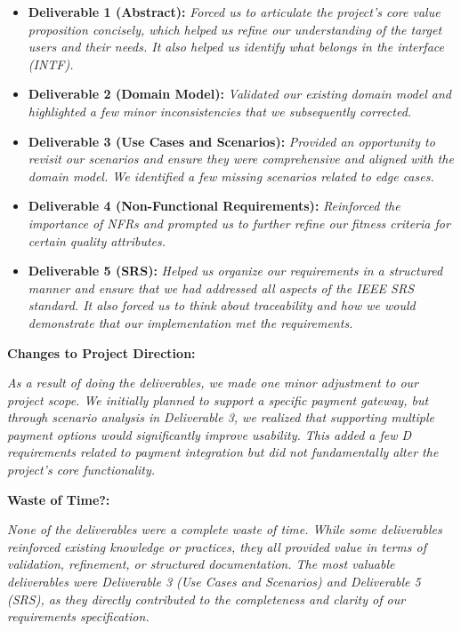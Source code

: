 \documentclass{article}
\begin{document}
\begin{itemize}
    \item \textbf{Deliverable 1 (Abstract):} \textit{Forced us to articulate the project's core value proposition concisely, which helped us refine our understanding of the target users and their needs. It also helped us identify what belongs in the interface (INTF).}
    \item \textbf{Deliverable 2 (Domain Model):} \textit{Validated our existing domain model and highlighted a few minor inconsistencies that we subsequently corrected.}
    \item \textbf{Deliverable 3 (Use Cases and Scenarios):} \textit{Provided an opportunity to revisit our scenarios and ensure they were comprehensive and aligned with the domain model. We identified a few missing scenarios related to edge cases.}
    \item \textbf{Deliverable 4 (Non-Functional Requirements):} \textit{Reinforced the importance of NFRs and prompted us to further refine our fitness criteria for certain quality attributes.}
    \item \textbf{Deliverable 5 (SRS):} \textit{Helped us organize our requirements in a structured manner and ensure that we had addressed all aspects of the IEEE SRS standard. It also forced us to think about traceability and how we would demonstrate that our implementation met the requirements.}
\end{itemize}

\textbf{Changes to Project Direction:}

\textit{As a result of doing the deliverables, we made one minor adjustment to our project scope. We initially planned to support a specific payment gateway, but through scenario analysis in Deliverable 3, we realized that supporting multiple payment options would significantly improve usability. This added a few D requirements related to payment integration but did not fundamentally alter the project's core functionality.}

\textbf{Waste of Time?:}

\textit{None of the deliverables were a complete waste of time. While some deliverables reinforced existing knowledge or practices, they all provided value in terms of validation, refinement, or structured documentation. The most valuable deliverables were Deliverable 3 (Use Cases and Scenarios) and Deliverable 5 (SRS), as they directly contributed to the completeness and clarity of our requirements specification.}
\end{document}
